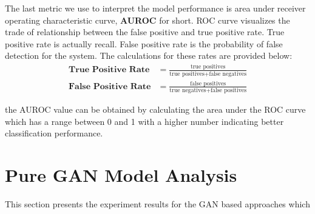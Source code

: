 The last metric we use to interpret the model performance is area under receiver operating characteristic 
curve, \textbf{AUROC} for short. ROC curve visualizes the trade of relationship between the false positive 
and true positive rate. True positive rate is actually recall. False positive rate is the probability 
of false detection for the system. The calculations for these rates are provided below:
\begin{align}
\textbf{True Positive Rate} & = \frac{\text{true positives}}{\text{true positives} + \text{false negatives}} \\[5pt]
\textbf{False Positive Rate} & = \frac{\text{false positives}}{\text{true negatives} + \text{false positives}}
\end{align}

the AUROC value can be obtained by calculating the area under the ROC curve which has a range between 0 and 1 with a higher number indicating better classification performance.

\section{Pure GAN Model Analysis}
This section presents the experiment results for the GAN based approaches which

